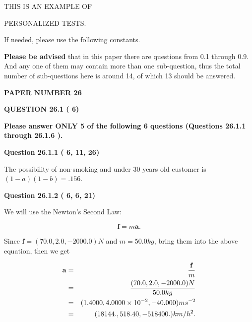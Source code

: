 \documentclass[12pt]{article}
\begin{document}
 
 
   
   
   
   
   
   
 
 
{\Huge  THIS IS AN EXAMPLE OF}
 
{\Huge  PERSONALIZED TESTS. }
 
If needed, please use the following constants.
 
 
 
{\textbf{\large{Please be advised}}} that in this paper there are questions from
0.1 through
0.9.
And any one of them may contain more than one sub-question, thus the total number
of sub-questions here is around 14, of which
13 should be answered.
 
\vspace{0.3in}
 
 
   
   
   
   
\setcounter{page}{ 
    26001 } 
   
   
 {\textbf{ \Large{ PAPER NUMBER          26 }}}
   
   
   
   
  
\vspace{0.2in}
  
{\textbf{\Large{QUESTION
26.1 
 (          6)
}}}
  
  
{\textbf{\Large{Please answer ONLY  %
           5 %
 of the following  %
           6 %
 questions (Questions  %
26.1.1 %
 through  %
26.1.6 %
 ). }}}
   
   
  
  
{\textbf{\large{Question
26.1.1 
 (          6,         11,         26)
}}}

The possibility of  %
 non-smoking and  %
under 30 years old
customer is $ (1-a)(1-b) =  %
.156 $.
  
  
{\textbf{\large{Question
26.1.2 
 (          6,          6,         21)
}}}

We will use the Newton's Second Law:
 
\[
\mathbf{f}=m\mathbf{a}.
\]
 
Since $\mathbf{f}=( %
70.0,  %
2.0,  %
-2000.0 )N$
and $m= %
50.0 kg$, bring them into the above equation, then we get
 
\begin{eqnarray*}
\mathbf{a}&=&\frac{\mathbf{f}}m  \\
&=&\frac{(
70.0 ,
2.0 ,
-2000.0 )N
}{ %
50.0 kg}  \\
&=&(
1.4000 ,
4.0000 \times 10^{-2},
-40.000
)ms^{-2} \\
&=&(
18144. ,
518.40 ,
-518400.
)km/h^2.
\end{eqnarray*}
 
\end{document}
